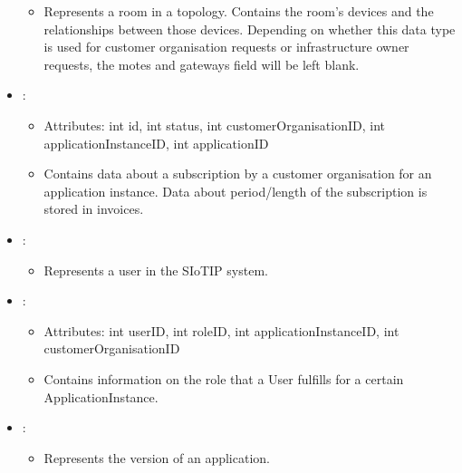 \begin{itemize}[nolistsep,noitemsep]
\begin{itemize}[noitemsep,nolistsep]
\item[] Represents a room in a topology. Contains the room's devices and the relationships between those devices. Depending on whether this data type is used for customer organisation requests or infrastructure owner requests, the motes and gateways field will be left blank.
\end{itemize}
\item {}: 
\begin{itemize}[noitemsep,nolistsep]
\item[] Attributes: int id, int status, int customerOrganisationID, int applicationInstanceID, int applicationID
\item[] Contains data about a subscription by a customer organisation for an application instance. Data about period/length of the subscription is stored in invoices.
\end{itemize}
\item {}: 
\begin{itemize}[noitemsep,nolistsep]

\item[] Represents a user in the SIoTIP system.
\end{itemize}
\item {}: 
\begin{itemize}[noitemsep,nolistsep]
\item[] Attributes: int userID, int roleID, int applicationInstanceID, int customerOrganisationID
\item[] Contains information on the role that a User fulfills for a certain ApplicationInstance.
\end{itemize}
\item {}: 
\begin{itemize}[noitemsep,nolistsep]

\item[] Represents the version of an application.
\end{itemize}
\end{itemize}

%